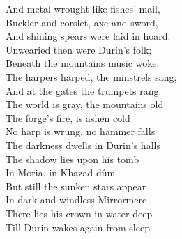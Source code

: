 \begin{flushleft}
And metal wrought like fishes' mail, \\
Buckler and corslet, axe and sword, \\
And shining spears were laid in hoard. \\
\hops
\tab{}\tab{}
\hops
{}
Unwearied then were Durin's folk; \\
Beneath the mountains music woke: \\
The harpers harped, the minstrels sang, \\
And at the gates the trumpets rang. \\
\hop
The world is gray, the mountains old \\
The forge's fire, is ashen cold  \tab{}\\
No harp is wrung, no hammer falls \\
The darkness dwells in Durin's halls \\
The shadow lies upon his tomb \\
In Moria, in Khazad-dûm \tab{}\\
But still the sunken stars appear  \\
In dark and windless Mirrormere  \\
There lies his crown in water deep  \\
Till Durin wakes again from sleep \\
\end{flushleft}
\newpage